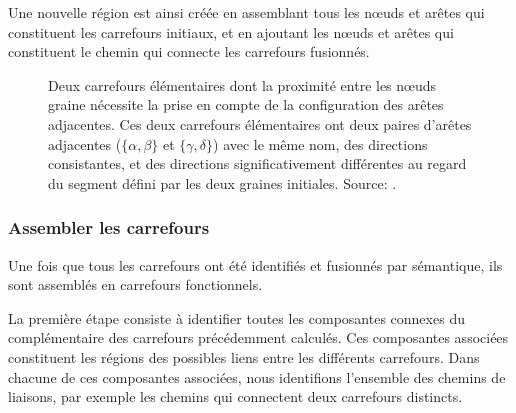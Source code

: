 \newpar{}

Une nouvelle région est ainsi créée en assemblant tous les nœuds et arêtes qui constituent les carrefours initiaux, et en ajoutant les nœuds et arêtes qui constituent le chemin qui connecte les carrefours fusionnés.

\begin{figure}[ht]
    \centering
    \caption[Assemblage de deux carrefours élémentaires]{
        Deux carrefours élémentaires dont la proximité entre les nœuds graine nécessite la prise en compte de la configuration des arêtes adjacentes. Ces deux carrefours élémentaires ont deux paires d'arêtes adjacentes ($\{\alpha, \beta\}$ et $\{\gamma, \delta\}$) avec le même nom, des directions consistantes, et des directions significativement différentes au regard du segment défini par les deux graines initiales. Source: \citep{Favreau2022}.}
    \label{fig:modelisation_elementary_edges_relative_angle}
\end{figure}

\subsubsection{Assembler les carrefours}

Une fois que tous les carrefours ont été identifiés et fusionnés par sémantique, ils sont assemblés en carrefours fonctionnels.

\newpar{}

La première étape consiste à identifier toutes les composantes connexes du complémentaire des carrefours précédemment calculés. Ces composantes associées constituent les régions des possibles liens entre les différents carrefours. Dans chacune de ces composantes associées, nous identifions l'ensemble des chemins de liaisons, par exemple les chemins qui connectent deux carrefours distincts.

\newpar{}

